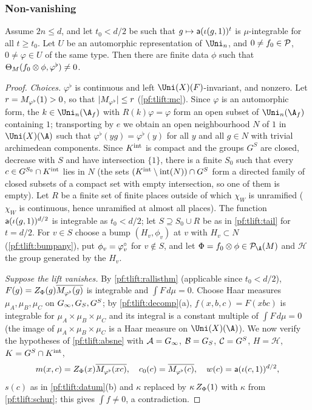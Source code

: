 \subsubsection*{Non-vanishing}
\begin{theorem}\label{pf:tlift:nonvanthm}
Assume $2n\le d$, and let $t_0<d/2$ be such that $g\mapsto\mathsf{a}(\iota(g,1))^t$ is $\mu$-integrable for all $t\ge t_0$. Let
$U$ be an automorphic representation of $\Uni_n$, and $0\ne f_0\in\mathcal{P}$, $0\ne\varphi\in U$ of the same type. Then
there are finite data $\phi$ such that $\Theta_M(f_0\otimes\phi,\varphi^\flat)\ne0$.
\end{theorem}

\begin{proof}
\emph{Choices.} $\varphi^\flat$ is continuous and left $\Uni(X)(F)$-invariant, and nonzero. Let $r=M_{\varphi^\flat}(1)>0$, so that
$|M_{\varphi^\flat}|\le r$ (\cref{pf:tlift:mc}). Since $\varphi$ is an automorphic form, the $k\in\Uni_n(\A_f)$ with
$R(k)\varphi=\varphi$ form an open subset of $\Uni_n(\A_f)$ containing $1$; transporting by $e$ we obtain an open
neighbourhood $N$ of $1$ in $\Uni(X)(\A)$ such that $\varphi^\flat(yg)=\varphi^\flat(y)$ for all $y$ and all $g\in N$ with trivial
archimedean components. Since $K^{\mathrm{int}}$ is compact and the
groups $G^{S}$ are closed, decrease with $S$ and have intersection $\{1\}$, there is a finite $S_0$ such that every
$c\in G^{S_0}\cap K^{\mathrm{int}}$ lies in $N$ (the sets $(K^{\mathrm{int}}\setminus\mathrm{int}(N))\cap G^S$ form a directed family of closed
subsets of a compact set with empty intersection, so one of them is empty). Let $R$ be a finite set of finite places outside of which
$\chi_W$ is unramified ($\chi_W$ is continuous, hence unramified at almost all places). The function
$\mathsf{a}(\iota(g,1))^{d/2}$ is integrable as $t_0<d/2$; let $S\supseteq S_0\cup R$ be as in \cref{pf:tlift:tail} for $t=d/2$. For
$v\in S$ choose a bump $(H_v,\phi_v)$ at $v$ with $H_v\subset N$ (\cref{pf:tlift:bumpany}), put $\phi_v=\varphi^{\circ}_v$ for $v\notin S$,
and let $\Phi=f_0\otimes\phi\in\tliftPD(M)$ and $\mathcal H$ the group generated by the $H_v$.

\emph{Suppose the lift vanishes.} By \cref{pf:tlift:rallisthm} (applicable since $t_0<d/2$),
$F(g)=Z_\Phi(g)\overline{M_{\varphi^\flat}(g)}$ is integrable and $\int F\,d\mu=0$. Choose Haar measures $\mu_A,\mu_B,\mu_C$ on
$G_\infty,G_S,G^{S}$; by \cref{pf:tlift:decomp}(a), $f(x,b,c)=F(xbc)$ is integrable for $\mu_A\times\mu_B\times\mu_C$ and its
integral is a constant multiple of $\int F\,d\mu=0$ (the image of $\mu_A\times\mu_B\times\mu_C$ is a Haar measure on
$\Uni(X)(\A)$). We now verify the hypotheses of
\cref{pf:tlift:absne} with $\mathcal A=G_\infty$, $\mathcal B=G_S$, $\mathcal C=G^{S}$, $H=\mathcal H$, $K=G^{S}\cap K^{\mathrm{int}}$,
\[
  m(x,c)=Z_\Phi(x)\overline{M_{\varphi^\flat}(xc)},\quad c_0(c)=\overline{M_{\varphi^\flat}(c)},\quad
  w(c)=\mathsf{a}(\iota(c,1))^{d/2},
\]
$s(c)$ as in \cref{pf:tlift:datum}(b) and $\kappa$ replaced by $\kappa\,Z_\Phi(1)$ with $\kappa$ from \cref{pf:tlift:schur}; this
gives $\int f\ne0$, a contradiction.


\end{proof}
